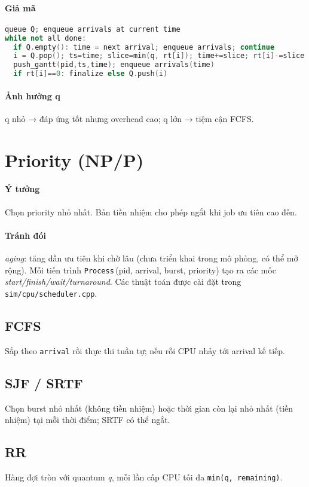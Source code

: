 \documentclass[12pt,a4paper]{report}
\begin{document}
\paragraph{Giả mã}
\begin{lstlisting}[language=C++]
queue Q; enqueue arrivals at current time
while not all done:
  if Q.empty(): time = next arrival; enqueue arrivals; continue
  i = Q.pop(); ts=time; slice=min(q, rt[i]); time+=slice; rt[i]-=slice
  push_gantt(pid,ts,time); enqueue arrivals(time)
  if rt[i]==0: finalize else Q.push(i)
\end{lstlisting}
\paragraph{Ảnh hưởng q} q nhỏ → đáp ứng tốt nhưng overhead cao; q lớn → tiệm cận FCFS.

\section{Priority (NP/P)}
\paragraph{Ý tưởng} Chọn priority nhỏ nhất. Bản tiền nhiệm cho phép ngắt khi job ưu tiên cao đến.
\paragraph{Tránh đói} \textit{aging}: tăng dần ưu tiên khi chờ lâu (chưa triển khai trong mô phỏng, có thể mở rộng).
Mỗi tiến trình \texttt{Process}\,(pid, arrival, burst, priority) tạo ra các mốc \textit{start/finish/wait/turnaround}. Các thuật toán được cài đặt trong \texttt{sim/cpu/scheduler.cpp}.
\subsection*{FCFS} Sắp theo \texttt{arrival} rồi thực thi tuần tự; nếu rỗi CPU nhảy tới arrival kế tiếp.
\subsection*{SJF / SRTF} Chọn burst nhỏ nhất (không tiền nhiệm) hoặc thời gian còn lại nhỏ nhất (tiền nhiệm) tại mỗi thời điểm; SRTF có thể ngắt.
\subsection*{RR} Hàng đợi tròn với quantum \textit{q}, mỗi lần cấp CPU tối đa \texttt{min(q, remaining)}.
\end{document}
